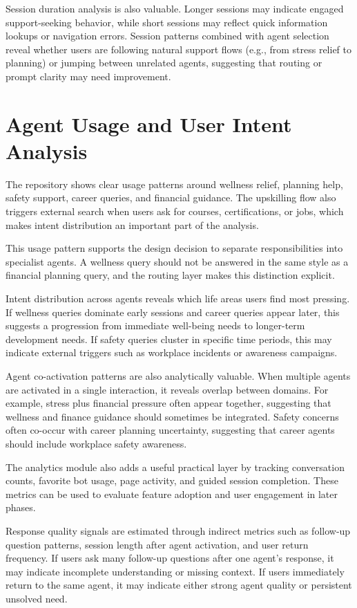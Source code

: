 \documentclass[oneside,a4paper,12pt]{report}
\begin{document}
Session duration analysis is also valuable. Longer sessions may indicate engaged support-seeking behavior, while short sessions may reflect quick information lookups or navigation errors. Session patterns combined with agent selection reveal whether users are following natural support flows (e.g., from stress relief to planning) or jumping between unrelated agents, suggesting that routing or prompt clarity may need improvement.

\section{Agent Usage and User Intent Analysis}
The repository shows clear usage patterns around wellness relief, planning help, safety support, career queries, and financial guidance. The upskilling flow also triggers external search when users ask for courses, certifications, or jobs, which makes intent distribution an important part of the analysis.

This usage pattern supports the design decision to separate responsibilities into specialist agents. A wellness query should not be answered in the same style as a financial planning query, and the routing layer makes this distinction explicit.

Intent distribution across agents reveals which life areas users find most pressing. If wellness queries dominate early sessions and career queries appear later, this suggests a progression from immediate well-being needs to longer-term development needs. If safety queries cluster in specific time periods, this may indicate external triggers such as workplace incidents or awareness campaigns.

Agent co-activation patterns are also analytically valuable. When multiple agents are activated in a single interaction, it reveals overlap between domains. For example, stress plus financial pressure often appear together, suggesting that wellness and finance guidance should sometimes be integrated. Safety concerns often co-occur with career planning uncertainty, suggesting that career agents should include workplace safety awareness.

The analytics module also adds a useful practical layer by tracking conversation counts, favorite bot usage, page activity, and guided session completion. These metrics can be used to evaluate feature adoption and user engagement in later phases.

Response quality signals are estimated through indirect metrics such as follow-up question patterns, session length after agent activation, and user return frequency. If users ask many follow-up questions after one agent's response, it may indicate incomplete understanding or missing context. If users immediately return to the same agent, it may indicate either strong agent quality or persistent unsolved need.
\end{document}
